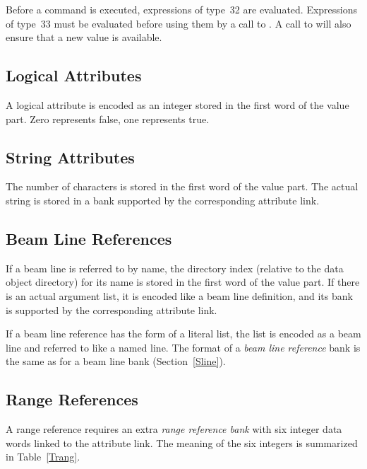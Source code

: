 Before a command is executed, expressions of type~32 are evaluated.
Expressions of type~33 must be evaluated before using them by a call
to .
A call to  will also ensure that a new value is available.
 
\subsection{Logical Attributes}
A logical attribute is encoded as an integer stored in the first word
of the value part.
Zero represents false, one represents true.
 
\subsection{String Attributes}
The number of characters is stored in the first word of the value part.
The actual string is stored in a bank supported by the corresponding
attribute link.
 
\subsection{Beam Line References}
If a beam line is referred to by name,
the directory index (relative to the data object directory)
for its name is stored in the first word of the value part.
If there is an actual argument list,
it is encoded like a beam line definition,
and its bank is supported by the corresponding attribute link.
 
If a beam line reference has the form of a literal list,
the list is encoded as a beam line and referred to like a named line.
The format of a {\em beam line reference}
bank is the same as for a beam line bank (Section~\ref{Sline}).
 
\subsection{Range References}
A range reference requires an extra {\em range reference bank}
with six integer data words linked to the attribute link.
The meaning of the six integers is summarized in Table~\ref{Trang}.
 
